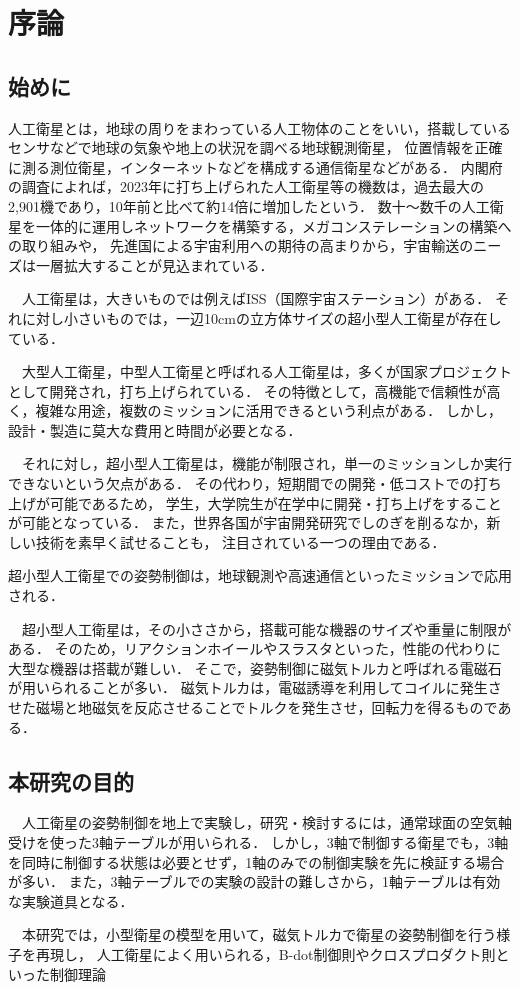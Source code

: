 \section{序論}
\subsection{始めに}
人工衛星とは，地球の周りをまわっている人工物体のことをいい，搭載しているセンサなどで地球の気象や地上の状況を調べる地球観測衛星，
位置情報を正確に測る測位衛星，インターネットなどを構成する通信衛星などがある．
内閣府の調査によれば，2023年に打ち上げられた人工衛星等の機数は，過去最大の2,901機であり，10年前と比べて約14倍に増加したという．
数十～数千の人工衛星を一体的に運用しネットワークを構築する，メガコンステレーションの構築への取り組みや，
先進国による宇宙利用への期待の高まりから，宇宙輸送のニーズは一層拡大することが見込まれている．

　人工衛星は，大きいものでは例えばISS（国際宇宙ステーション）がある．
それに対し小さいものでは，一辺10cmの立方体サイズの超小型人工衛星が存在している．

　大型人工衛星，中型人工衛星と呼ばれる人工衛星は，多くが国家プロジェクトとして開発され，打ち上げられている．
その特徴として，高機能で信頼性が高く，複雑な用途，複数のミッションに活用できるという利点がある．
しかし，設計・製造に莫大な費用と時間が必要となる．

　それに対し，超小型人工衛星は，機能が制限され，単一のミッションしか実行できないという欠点がある．
その代わり，短期間での開発・低コストでの打ち上げが可能であるため，
学生，大学院生が在学中に開発・打ち上げをすることが可能となっている．
また，世界各国が宇宙開発研究でしのぎを削るなか，新しい技術を素早く試せることも，
注目されている一つの理由である．

超小型人工衛星での姿勢制御は，地球観測や高速通信といったミッションで応用される．

　超小型人工衛星は，その小ささから，搭載可能な機器のサイズや重量に制限がある．
そのため，リアクションホイールやスラスタといった，性能の代わりに大型な機器は搭載が難しい．
そこで，姿勢制御に磁気トルカと呼ばれる電磁石が用いられることが多い．
磁気トルカは，電磁誘導を利用してコイルに発生させた磁場と地磁気を反応させることでトルクを発生させ，回転力を得るものである．


\subsection{本研究の目的}
　人工衛星の姿勢制御を地上で実験し，研究・検討するには，通常球面の空気軸受けを使った3軸テーブルが用いられる．
しかし，3軸で制御する衛星でも，3軸を同時に制御する状態は必要とせず，1軸のみでの制御実験を先に検証する場合が多い．
また，3軸テーブルでの実験の設計の難しさから，1軸テーブルは有効な実験道具となる．

　本研究では，小型衛星の模型を用いて，磁気トルカで衛星の姿勢制御を行う様子を再現し，
人工衛星によく用いられる，B-dot制御則やクロスプロダクト則といった制御理論


